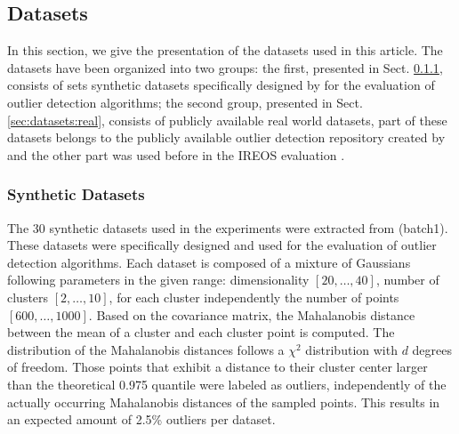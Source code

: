 
\subsection{Datasets}
In this section, we give the presentation of the datasets used in this article. The datasets have been organized into two groups: the first, presented in Sect. \ref{sec:datasets:synthetic}, consists of sets synthetic datasets specifically designed by \cite{zimek2013b} for the evaluation of outlier detection algorithms; the second group, presented in Sect. \ref{sec:datasets:real}, consists of publicly available real world datasets, part of these datasets belongs to the publicly available outlier detection repository created by \cite{campos2016} and the other part was used before in the IREOS evaluation \cite{marques2015}. 

\subsubsection{Synthetic Datasets}
\label{sec:datasets:synthetic}
The 30 synthetic datasets used in the experiments were extracted from \cite{zimek2013b} (batch1). These datasets were specifically designed and used for the evaluation of outlier detection algorithms. Each dataset is composed of a mixture of Gaussians following parameters in the given range: dimensionality $[20, \dots, 40]$, number of clusters $[2, \dots, 10]$, for each cluster independently the number of points $[600, \dots, 1000]$. Based on the covariance matrix, the Mahalanobis distance between the mean of a cluster and each cluster point is computed. The distribution of the Mahalanobis distances follows a $\chi^2$ distribution with $d$ degrees of freedom. Those points that exhibit a distance to their cluster center larger than the theoretical 0.975 quantile were labeled as outliers, independently of the actually occurring Mahalanobis distances of the sampled points. This results in an expected amount of 2.5\% outliers per dataset.

